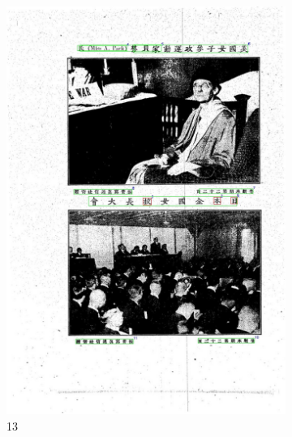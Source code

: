 \documentclass{beamer}
\begin{document}
\begin{frame}
\begin{figure}[htbp]
\begin{subfigure}[b]{0.3\linewidth}
            \includegraphics[height=1.35\linewidth]{./figures/samples/13.jpg}
            \caption{13}
            \label{fig:ours_13}
        \end{subfigure}
        \hfill
        \begin{subfigure}[b]{0.3\linewidth}

\end{subfigure}
\end{figure}
\end{frame}
\end{document}
